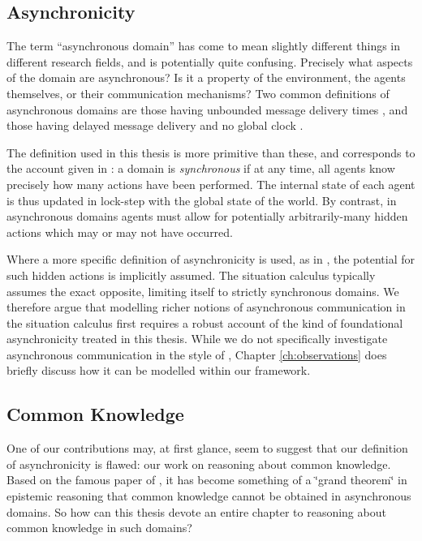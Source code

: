 \subsection{Asynchronicity}

The term {}``asynchronous domain'' has come to mean slightly different
things in different research fields, and is potentially quite confusing.
Precisely what aspects of the domain are asynchronous? Is it a property
of the environment, the agents themselves, or their communication
mechanisms? Two common definitions of asynchronous domains are those
having unbounded message delivery times \citep{fischer85distributed_consensus},
and those having delayed message delivery and no global clock \citep{halpern90knowledge_distrib}.

The definition used in this thesis is more primitive than these, and
corresponds to the account given in \citep{vanBentham06tree_of_knowledge}:
a domain is \emph{synchronous} if at any time, all agents know precisely
how many actions have been performed. The internal state of each agent
is thus updated in lock-step with the global state of the world. By
contrast, in asynchronous domains agents must allow for potentially
arbitrarily-many hidden actions which may or may not have occurred.

Where a more specific definition of asynchronicity is used, as in
\citep{fischer85distributed_consensus,halpern90knowledge_distrib},
the potential for such hidden actions is implicitly assumed. The situation
calculus typically assumes the exact opposite, limiting itself to
strictly synchronous domains. We therefore argue that modelling richer
notions of asynchronous communication in the situation calculus first
requires a robust account of the kind of foundational asynchronicity
treated in this thesis. While we do not specifically investigate asynchronous
communication in the style of \citep{fischer85distributed_consensus,halpern90knowledge_distrib},
Chapter \ref{ch:observations} does briefly discuss how it can be
modelled within our framework.


\subsection{Common Knowledge}

One of our contributions may, at first glance, seem to suggest that
our definition of asynchronicity is flawed: our work on reasoning
about common knowledge. Based on the famous paper of \citet{halpern90knowledge_distrib},
it has become something of a \char`\"{}grand theorem\char`\"{} in
epistemic reasoning that common knowledge cannot be obtained in asynchronous
domains. So how can this thesis devote an entire chapter to reasoning
about common knowledge in such domains?

